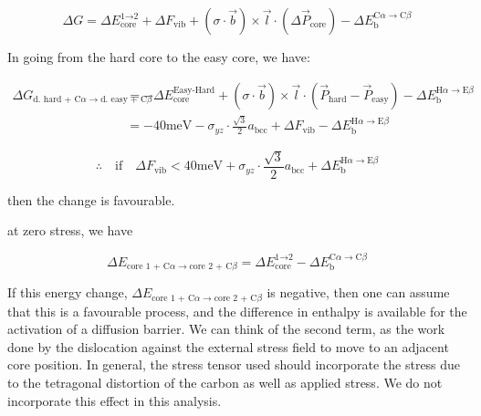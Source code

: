 \documentclass[a4paper,12pt,oneside,print,numbered,index,PageStyleIII]{PhDThesisPSnPDF}
\begin{document}
\begin{enumerate}
\begin{equation}
 \Delta G
   =  \Delta E_{\text{core}}^{\text{1} \rightarrow \text{2}}
       + \Delta F_{\text{vib} }
       + (\sigma \cdot \vec{b}) \times \vec{l}  \cdot ( \Delta\vec{P}_{\text{core}} )
       - \Delta E_{\text{b}}^{\text{C}\alpha \rightarrow \text{C}\beta}
\end{equation}

In going from the hard core to the easy core, we have:

    \begin{align}
     \Delta G_{ \text{d. hard + C}\alpha \rightarrow \text{d. easy + C}\beta }
       &=   - \Delta E_{\text{core}}^{\text{Easy-Hard}}
    	   + (\sigma \cdot \vec{b}) \times \vec{l}  \cdot ( \vec{P}_{\text{hard}} - \vec{P}_{\text{easy}} )
       - \Delta E_{\text{b}}^{\text{H}\alpha \rightarrow \text{E}\beta}\\
&= - 40\text{meV} - \sigma_{yz} \cdot \frac{\sqrt{3}}{2} a_{\text{bcc} } + \Delta F_{\text{vib} } - \Delta E_{\text{b}}^{\text{H}\alpha \rightarrow \text{E}\beta}
    \end{align}

\[ \therefore \quad \text{if}\quad \Delta F_{\text{vib} } < 40 \text{meV} + \sigma_{yz} \cdot \frac{\sqrt{3}}{2} a_{\text{bcc} } + \Delta E_{\text{b}}^{\text{H}\alpha \rightarrow \text{E}\beta} \]

then the change is favourable.




at zero stress, we have

\begin{equation}
 \Delta E_{ \text{core 1 + C}\alpha \rightarrow \text{core 2 + C}\beta }
   =  \Delta E_{\text{core}}^{\text{1} \rightarrow \text{2}} - \Delta E_{\text{b}}^{\text{C}\alpha \rightarrow \text{C}\beta}
\end{equation}


If this energy change, \(\Delta E_{
     \text{core 1 + C}\alpha \rightarrow \text{core 2 + C}\beta }\) is negative, then one can assume
   that this is a favourable process, and the difference in enthalpy is available for the activation of a
   diffusion barrier. We can think of the second term, as the work done by the dislocation against
   the external stress field to move to an adjacent core position. In general, the stress tensor
   used should incorporate the stress due to the tetragonal distortion of the carbon as well as
   applied stress. We do not incorporate this effect in this analysis.



\end{enumerate}
\end{document}
